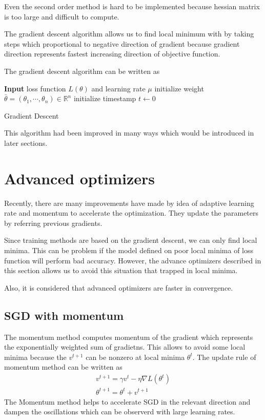 \documentclass[11pt]{article}
\begin{document}
	Even the second order method is hard to be implemented because hessian matrix is too large and difficult to compute.

	The gradient descent algorithm allows us to find local minimum with by taking steps which proportional to negative direction of gradient because gradient direction represents fastest increasing direction of objective function.


	The gradient descent algorithm can be written as

	\begin{algorithm}[H]
		\SetAlgoLined
		\textbf{Input} loss function $L(\theta)$ and learning rate $\mu$\;
		 initialize weight $\bar{\theta}=(\theta_1,\cdots,\theta_n)\in\mathbb{R}^n$\;
		 initialize timestamp $t\longleftarrow 0$\;
		 
		 \caption{Gradient Descent}
	\end{algorithm}
	
	This algorithm had been improved in many ways which would be introduced in later sections.

	\section{Advanced optimizers}
	Recently, there are many improvements have made by idea of adaptive learning rate and momentum to accelerate the optimization. They update the parameters by referring previous gradients.

	Since training methods are based on the gradient descent, we can only find local minima. This can be problem if the model defined on poor local minima of loss function will perform bad accuracy. However, the advance optimizers described in this section allows us to avoid this situation that trapped in local minima.

	Also, it is considered that advanced optimizers are faster in convergence.
	\subsection{SGD with momentum}
	The momentum method computes momentum of the gradient which represents the exponentially weighted sum of gradietns. This allows to avoid some local minima because the $v^{t+1}$ can be nonzero at local minima $\theta^t$. The update rule of momentum method can be written as
	\begin{equation*}
		\begin{aligned}
			v^{t+1}=\gamma v^t-\eta \nabla L(\theta^t)\\
			\theta^{t+1}=\theta^t+v^{t+1}
		\end{aligned}
	\end{equation*}
	The Momentum method helps to accelerate SGD in the relevant direction and dampen the oscillations which can be observerd with large learning rates.
\end{document}
